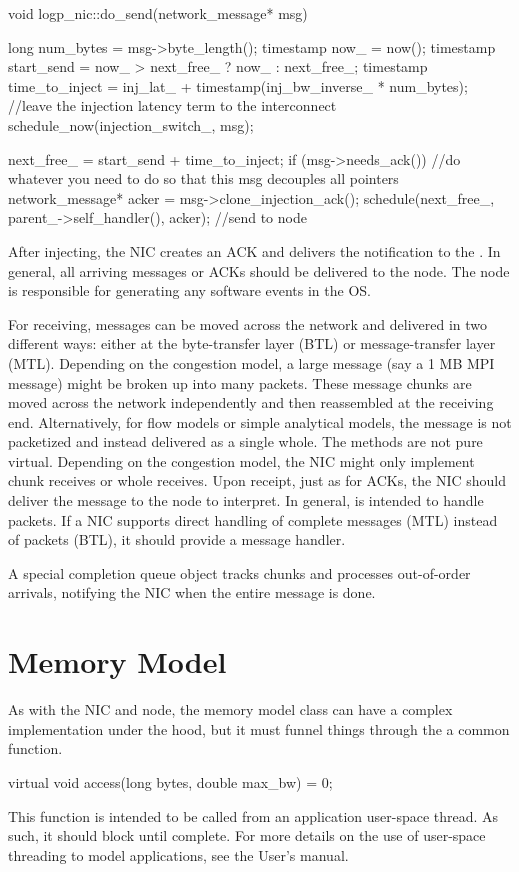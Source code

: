 \begin{CppCode}
void logp_nic::do_send(network_message* msg)
{
  long num_bytes = msg->byte_length();
  timestamp now_ = now();
  timestamp start_send = now_ > next_free_ ? now_ : next_free_;
  timestamp time_to_inject = inj_lat_ + timestamp(inj_bw_inverse_ * num_bytes);
  //leave the injection latency term to the interconnect
  schedule_now(injection_switch_, msg);

  next_free_ = start_send + time_to_inject;
  if (msg->needs_ack()) {
    //do whatever you need to do so that this msg decouples all pointers
    network_message* acker = msg->clone_injection_ack();
    schedule(next_free_, parent_->self_handler(), acker); //send to node
  }
}
\end{CppCode}
After injecting, the NIC creates an ACK and delivers the notification to the \nodecls.
In general, all arriving messages or ACKs should be delivered to the node.
The node is responsible for generating any software events in the OS.

For receiving, messages can be moved across the network and delivered in two different ways:
either at the byte-transfer layer (BTL) or message-transfer layer (MTL).
Depending on the congestion model, a large message (say a 1 MB MPI message) might be broken up into many packets.
These message chunks are moved across the network independently and then reassembled at the receiving end.
Alternatively, for flow models or simple analytical models, the message is not packetized and instead delivered as a single whole.
The methods are not pure virtual.  Depending on the congestion model,  the NIC might only implement chunk receives or whole receives.
Upon receipt, just as for ACKs, the NIC should deliver the message to the node to interpret.
In general,  is intended to handle packets. 
If a NIC supports direct handling of complete messages (MTL) instead of packets (BTL),
it should provide a message handler.

A special completion queue object tracks chunks and processes out-of-order arrivals,
notifying the NIC when the entire message is done.

\section{Memory Model}\label{sec:memModel}
As with the NIC and node, the memory model class can have a complex implementation under the hood,
but it must funnel things through the a common function.

\begin{CppCode}
virtual void access(long bytes, double max_bw) = 0;
\end{CppCode}

This function is intended to be called from an application user-space thread.
As such, it should block until complete.
For more details on the use of user-space threading to model applications,
see the User's manual.






